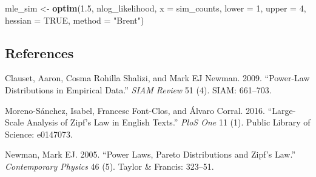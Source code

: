 \documentclass[]{article}
\newenvironment{Shaded}{\begin{snugshade}}{\end{snugshade}}
\newcommand{\DataTypeTok}[1]{\textcolor[rgb]{0.13,0.29,0.53}{#1}}
\newcommand{\DecValTok}[1]{\textcolor[rgb]{0.00,0.00,0.81}{#1}}
\newcommand{\FloatTok}[1]{\textcolor[rgb]{0.00,0.00,0.81}{#1}}
\newcommand{\KeywordTok}[1]{\textcolor[rgb]{0.13,0.29,0.53}{\textbf{#1}}}
\newcommand{\NormalTok}[1]{#1}
\newcommand{\OtherTok}[1]{\textcolor[rgb]{0.56,0.35,0.01}{#1}}
\newcommand{\StringTok}[1]{\textcolor[rgb]{0.31,0.60,0.02}{#1}}
\begin{document}
\begin{Shaded}
\begin{Highlighting}[]
\NormalTok{mle_sim <-}\StringTok{ }\KeywordTok{optim}\NormalTok{(}\FloatTok{1.5}\NormalTok{, nlog_likelihood, }\DataTypeTok{x =}\NormalTok{ sim_counts, }
  \DataTypeTok{lower =} \DecValTok{1}\NormalTok{, }\DataTypeTok{upper =} \DecValTok{4}\NormalTok{, }
  \DataTypeTok{hessian =} \OtherTok{TRUE}\NormalTok{, }\DataTypeTok{method =} \StringTok{"Brent"}\NormalTok{)}
\end{Highlighting}
\end{Shaded}

\hypertarget{references}{%
\subsection*{References}\label{references}}

\hypertarget{refs}{}
\leavevmode\hypertarget{ref-clauset2009power}{}%
Clauset, Aaron, Cosma Rohilla Shalizi, and Mark EJ Newman. 2009.
``Power-Law Distributions in Empirical Data.'' \emph{SIAM Review} 51
(4). SIAM: 661--703.

\leavevmode\hypertarget{ref-moreno2016large}{}%
Moreno-Sánchez, Isabel, Francesc Font-Clos, and Álvaro Corral. 2016.
``Large-Scale Analysis of Zipf's Law in English Texts.'' \emph{PloS One}
11 (1). Public Library of Science: e0147073.

\leavevmode\hypertarget{ref-newman2005power}{}%
Newman, Mark EJ. 2005. ``Power Laws, Pareto Distributions and Zipf's
Law.'' \emph{Contemporary Physics} 46 (5). Taylor \& Francis: 323--51.
\end{document}
